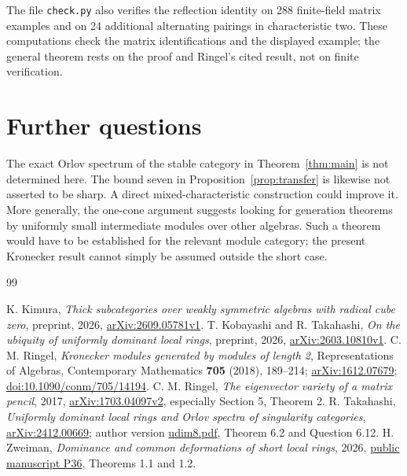\documentclass[11pt]{article}
\theoremstyle{definition}\newtheorem{definition}[theorem]{Definition}
\theoremstyle{remark}\newtheorem{remark}[theorem]{Remark}
\begin{document}
The file \texttt{check.py} also verifies the reflection identity on 288 finite-field matrix examples and on 24 additional alternating pairings in characteristic two. These computations check the matrix identifications and the displayed example; the general theorem rests on the proof and Ringel's cited result, not on finite verification.

\section{Further questions}
The exact Orlov spectrum of the stable category in Theorem~\ref{thm:main} is not determined here. The bound seven in Proposition~\ref{prop:transfer} is likewise not asserted to be sharp. A direct mixed-characteristic construction could improve it. More generally, the one-cone argument suggests looking for generation theorems by uniformly small intermediate modules over other algebras. Such a theorem would have to be established for the relevant module category; the present Kronecker result cannot simply be assumed outside the short case.

\begin{thebibliography}{99}
\raggedright
\small
\setlength{\itemsep}{3pt}
 K. Kimura, \emph{Thick subcategories over weakly symmetric algebras with radical cube zero}, preprint, 2026, \href{https://arxiv.org/abs/2609.05781v1}{arXiv:2609.05781v1}.
 T. Kobayashi and R. Takahashi, \emph{On the ubiquity of uniformly dominant local rings}, preprint, 2026, \href{https://arxiv.org/abs/2603.10810v1}{arXiv:2603.10810v1}.
 C. M. Ringel, \emph{Kronecker modules generated by modules of length 2}, Representations of Algebras, Contemporary Mathematics \textbf{705} (2018), 189--214; \href{https://arxiv.org/abs/1612.07679}{arXiv:1612.07679}; \href{https://doi.org/10.1090/conm/705/14194}{doi:10.1090/conm/705/14194}.
 C. M. Ringel, \emph{The eigenvector variety of a matrix pencil}, 2017, \href{https://arxiv.org/abs/1703.04097v2}{arXiv:1703.04097v2}, especially Section 5, Theorem 2.
 R. Takahashi, \emph{Uniformly dominant local rings and Orlov spectra of singularity categories}, \href{https://arxiv.org/abs/2412.00669}{arXiv:2412.00669}; author version \href{https://www.math.nagoya-u.ac.jp/~takahashi/udim8.pdf}{udim8.pdf}, Theorem 6.2 and Question 6.12.
 H. Zweiman, \emph{Dominance and common deformations of short local rings}, 2026, \href{https://github.com/Hwzw/algebra-number-theory-drafts/tree/96274cfe30f7844b4dfd4917cb6b8dd1106bb954/papers/P36-short-ring-dominance}{public manuscript P36}, Theorems 1.1 and 1.2.
\end{thebibliography}
\end{document}
